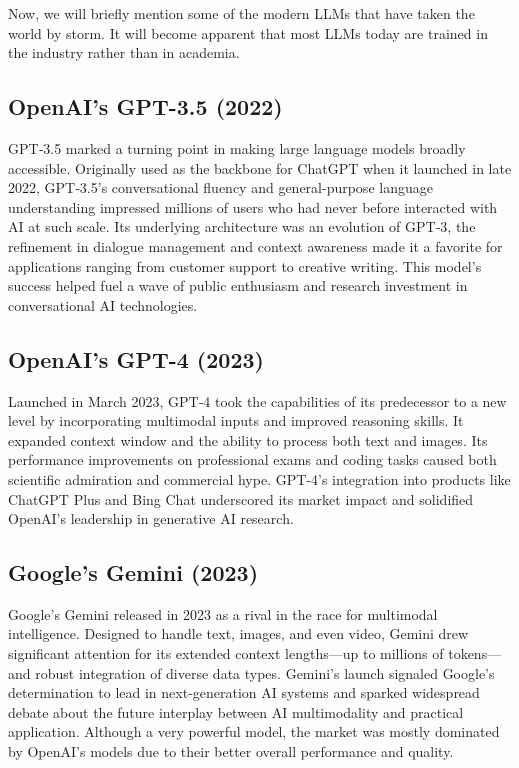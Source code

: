 Now, we will briefly mention some of the modern LLMs that have taken the world by storm. It will become apparent that most LLMs today are trained in the industry rather than in academia.

\subsection{OpenAI's GPT-3.5 (2022)}
GPT‑3.5 marked a turning point in making large language models broadly accessible. Originally used as the backbone for ChatGPT when it launched in late 2022, GPT‑3.5’s conversational fluency and general-purpose language understanding impressed millions of users who had never before interacted with AI at such scale. Its underlying architecture was an evolution of GPT‑3, the refinement in dialogue management and context awareness made it a favorite for applications ranging from customer support to creative writing. This model’s success helped fuel a wave of public enthusiasm and research investment in conversational AI technologies.

\subsection{OpenAI's GPT-4 (2023)}
Launched in March 2023, GPT‑4 took the capabilities of its predecessor to a new level by incorporating multimodal inputs and improved reasoning skills. It expanded context window and the ability to process both text and images. Its performance improvements on professional exams and coding tasks caused both scientific admiration and commercial hype. GPT‑4’s integration into products like ChatGPT Plus and Bing Chat underscored its market impact and solidified OpenAI’s leadership in generative AI research.

\subsection{Google's Gemini (2023)}
Google’s Gemini released in 2023 as a rival in the race for multimodal intelligence. Designed to handle text, images, and even video, Gemini drew significant attention for its extended context lengths—up to millions of tokens—and robust integration of diverse data types. Gemini’s launch signaled Google’s determination to lead in next‑generation AI systems and sparked widespread debate about the future interplay between AI multimodality and practical application. Although a very powerful model, the market was mostly dominated by OpenAI's models due to their better overall performance and quality.

